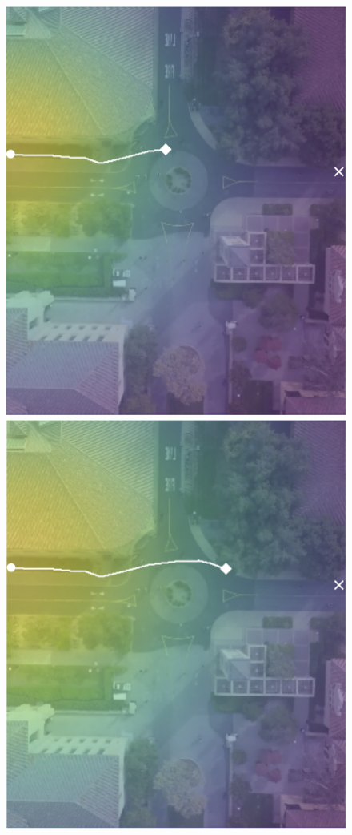 \documentclass[letterpaper,10pt,conference]{ieeeconf}
\begin{document}
\begin{figure}
\begin{minipage}[t]{0.3\linewidth}
	\includegraphics[width=\linewidth]{./figures/comparison/rand_death_1_2_t=250.png}
\end{minipage}
\begin{minipage}[t]{0.3\linewidth}
     \includegraphics[width=\linewidth]{./figures/comparison/rand_death_1_2_t=370.png}
\end{minipage}


\end{figure}
\end{document}
